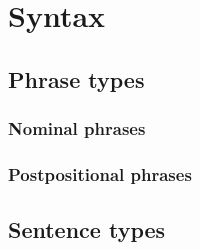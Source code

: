 \part{Syntax}

\chapter{Phrase types}

\section{Nominal phrases}

\section{Postpositional phrases}

\chapter{Sentence types}
